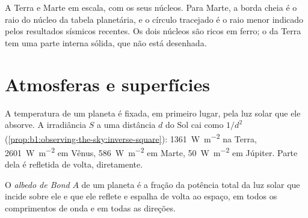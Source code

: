 \begin{omfigure}

{\small A Terra e Marte em escala, com os seus núcleos. Para Marte, a borda cheia é o raio do núcleo da tabela planetária, e o círculo tracejado é o raio menor indicado pelos resultados sísmicos recentes. Os dois núcleos são ricos em ferro; o da Terra tem uma parte interna sólida, que não está desenhada.}
\end{omfigure}

\section{Atmosferas e superfícies}

A temperatura de um planeta é fixada, em primeiro lugar, pela luz solar que ele absorve. A irradiância $S$ a uma distância $d$ do Sol cai como $1/d^2$ (\cref{prop:b1:observing-the-sky:inverse-square}): \qty{1361}{W.m^{-2}} na Terra, \qty{2601}{W.m^{-2}} em Vênus, \qty{586}{W.m^{-2}} em Marte, \qty{50}{W.m^{-2}} em Júpiter. Parte dela é refletida de volta, diretamente.

\begin{definition}\label{def:b1:comparative-planetology:albedo}
O \emph{albedo de Bond} $A$ de um planeta é a fração da potência total da luz solar que incide sobre ele e que ele reflete e espalha de volta ao espaço, em todos os comprimentos de onda e em todas as direções.
\end{definition}

